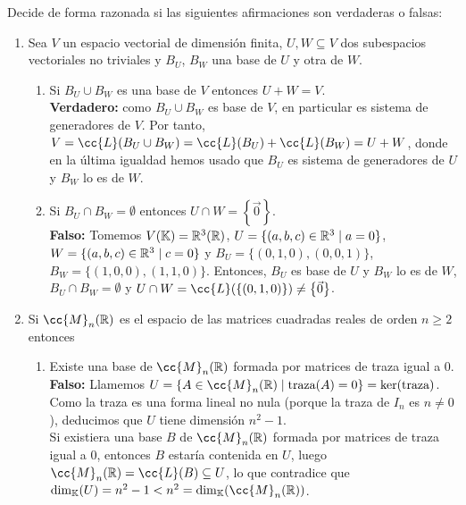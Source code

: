 \documentclass[12pt]{article}
\begin{document}
	\begin{ejercicio}[2.5 puntos] Decide de forma razonada si las siguientes afirmaciones son verdaderas o falsas:
			
			\begin{enumerate} 
				\item Sea $V$ un espacio vectorial de dimensión finita, $U,W \subseteq V$ dos subespacios vectoriales no
				triviales y $B_U$, $B_W$ una base de $U$ y otra de $W$.
				\begin{enumerate}
					\item  Si $B_U \cup B_W$ es una base de $V$ entonces $U + W = V$. \\
					\textbf{Verdadero:} como $B_U \cup B_W$ es base de $V$, en particular es sistema de generadores de $V$. Por tanto, $V = \cc{L}(B_U \cup B_W) = \cc{L}(B_U) + \cc{L}(B_W) = U + W$, donde en la última igualdad hemos usado que $B_U$ es sistema de generadores de $U$ y $B_W$ lo es de $W$.\\
					
					\item  Si $B_U \cap B_W = \emptyset$ entonces $U \cap W = \left\{\vec{0}\right\}$. \\
					\textbf{Falso:} Tomemos $V({\mathbb{K}}) = {\mathbb{R}}^3({\mathbb{R}})$, $U = \{(a,b,c) \in {\mathbb{R}}^3 \mid a = 0\}$, $W = \{(a,b,c) \in {\mathbb{R}}^3 \mid c = 0\}$ y $B_U = \{(0,1,0),(0,0,1)\}$, $B_W = \{(1,0,0),(1,1,0)\}$. Entonces, $B_U$ es base de $U$ y $B_W$ lo es de $W$, $B_U \cap B_W = \emptyset$ y $U \cap W = \cc{L}(\{(0,1,0)\}) \ne \left\{\vec{0}\right\}$.\\
					
				\end{enumerate}
				
				\item Si $\cc{M}_n(\R)$ es el espacio de las matrices cuadradas reales de orden $n \geq 2$ entonces
				\begin{enumerate}
					\item  Existe una base de $\cc{M}_n(\R)$ formada por matrices de traza igual a 0. \\
					\textbf{Falso:} Llamemos $U = \{A \in \cc{M}_n(\R) \mid \text{traza}(A) = 0\} = \ker(\text{traza})$. Como la traza es una forma lineal no nula (porque la traza de $I_n$ es $n \neq 0$), deducimos que $U$ tiene dimensión $n^2 - 1$. \\
					Si existiera una base $B$ de $\cc{M}_n(\R)$ formada por matrices de traza igual a 0, entonces $B$ estaría contenida en $U$, luego $\cc{M}_n(\R) = \cc{L}(B) \subseteq U$, lo que contradice que $\dim_{\K}(U) = n^2 - 1 < n^2 = \dim_{\K}(\cc{M}_n(\R))$. \\
					

\end{enumerate}
\end{enumerate}
\end{ejercicio}
\end{document}
